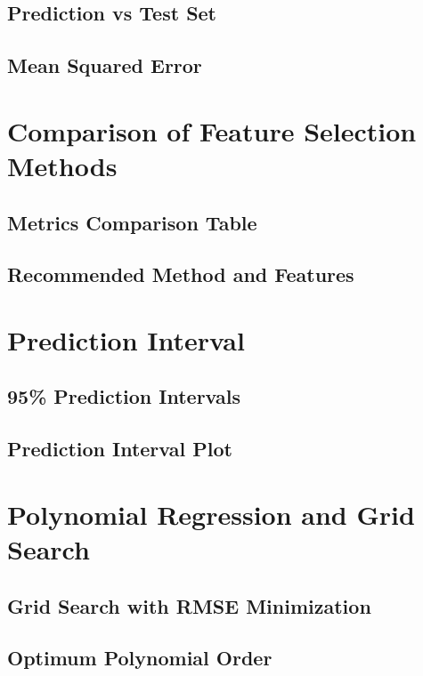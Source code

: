 \documentclass[12pt]{article}
\begin{document}
\subsection{Prediction vs Test Set}

\subsection{Mean Squared Error}

\section{Comparison of Feature Selection Methods}

\subsection{Metrics Comparison Table}

\subsection{Recommended Method and Features}

\section{Prediction Interval}

\subsection{95\% Prediction Intervals}

\subsection{Prediction Interval Plot}

\section{Polynomial Regression and Grid Search}

\subsection{Grid Search with RMSE Minimization}

\subsection{Optimum Polynomial Order}
\end{document}
